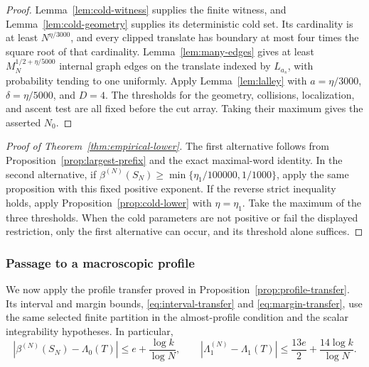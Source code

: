 \documentclass[11pt]{article}
\numberwithin{equation}{section}
\theoremstyle{definition}
\theoremstyle{remark}
\newcommand{\1}{\mathbf 1}
\begin{document}
\begin{proof}
Lemma~\ref{lem:cold-witness} supplies the finite witness, and
Lemma~\ref{lem:cold-geometry} supplies its deterministic cold set. Its
cardinality is at least $N^{\eta/3000}$, and every clipped translate has
boundary at most four times the square root of that cardinality.
Lemma~\ref{lem:many-edges} gives at least $M_N^{1/2+\eta/5000}$ internal
graph edges on the translate indexed by $L_{a_s}$, with probability tending
to one uniformly. Apply Lemma~\ref{lem:lalley} with $a=\eta/3000$,
$\delta=\eta/5000$, and $D=4$. The thresholds for the geometry, collisions,
localization, and ascent test are all fixed before the cut array. Taking
their maximum gives the asserted $N_0$.
\end{proof}



\begin{proof}[Proof of Theorem~\ref{thm:empirical-lower}]
The first alternative follows from Proposition~\ref{prop:largest-prefix}
and the exact maximal-word identity. In the second alternative, if
$\beta^{(N)}(S_N)\ge\min\{\eta_1/100000,1/1000\}$, apply the same
proposition with this fixed positive exponent. If the reverse strict
inequality holds, apply Proposition~\ref{prop:cold-lower} with
$\eta=\eta_1$. Take the maximum of the three thresholds. When the cold
parameters are not positive or fail the displayed restriction, only the
first alternative can occur, and its threshold alone suffices.
\end{proof}

\subsubsection{Passage to a macroscopic profile}

We now apply the profile transfer proved in Proposition~\ref{prop:profile-transfer}.
Its interval and margin bounds, \eqref{eq:interval-transfer} and
\eqref{eq:margin-transfer}, use the same selected finite partition in the
almost-profile condition and the scalar integrability hypotheses. In particular,
\[
 |\beta^{(N)}(S_N)-\Lambda_0(T)|\le e+\frac{\log k}{\log N},\qquad
 |\Lambda_1^{(N)}-\Lambda_1(T)|\le\frac{13e}{2}+\frac{14\log k}{\log N}.
\]
\end{document}
